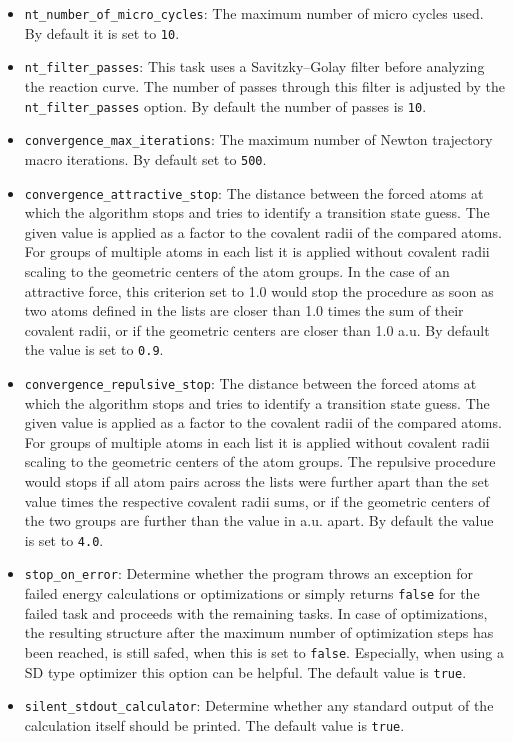 \documentclass[]{tufte-book}
\begin{document}
\begin{itemize}
\item \texttt{nt\_number\_of\_micro\_cycles}: The maximum number of micro cycles used. By default it is set to \texttt{10}.
\item \texttt{nt\_filter\_passes}: This task uses a Savitzky--Golay filter before analyzing the reaction curve. The number of passes
through this filter is adjusted by the \texttt{nt\_filter\_passes} option. By default the number of passes is \texttt{10}.
\item \texttt{convergence\_max\_iterations}: The maximum number of Newton trajectory macro iterations. By default set to \texttt{500}.
\item \texttt{convergence\_attractive\_stop}: The distance between the forced atoms at which the algorithm stops and tries to identify
a transition state guess. The given value is applied as a factor to the covalent radii of the compared atoms.
For groups of multiple atoms in each list it is applied without covalent radii scaling to the geometric centers of the atom groups.
In the case of an attractive force, this criterion set to 1.0 would stop the procedure as soon as two atoms defined in the lists
are closer than 1.0 times the sum of their covalent radii, or if the geometric centers are closer than 1.0 a.u.
By default the value is set to \texttt{0.9}.
\item \texttt{convergence\_repulsive\_stop}: The distance between the forced atoms at which the algorithm stops and tries to identify
a transition state guess. The given value is applied as a factor to the covalent radii of the compared atoms.
For groups of multiple atoms in each list it is applied without covalent radii scaling to the geometric centers of the atom groups.
The repulsive procedure would stops if all atom pairs across the lists were further apart than the set value times the respective
covalent radii sums, or if the geometric centers of the two groups are further than the value in a.u. apart.
By default the value is set to \texttt{4.0}.
\item \texttt{stop\_on\_error}: Determine whether the program throws an exception for failed energy calculations or optimizations or simply returns \texttt{false} for the failed task and proceeds with the remaining tasks. In case of optimizations, the resulting structure after the maximum number of optimization steps has been reached, is still safed, when this is set to \texttt{false}. Especially, when using a SD type optimizer this option can be helpful. The default value is \texttt{true}.
\item \texttt{silent\_stdout\_calculator}: Determine whether any standard output of the calculation itself should be printed. The default value is \texttt{true}.
\end{itemize}
\end{document}
